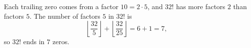 Each trailing zero comes from a factor $10=2\cdot5$, and $32!$ has more factors $2$ than factors $5$. The number of factors $5$ in $32!$ is
\[\left\lfloor\dfrac{32}{5}\right\rfloor+\left\lfloor\dfrac{32}{25}\right\rfloor=6+1=7,\]
so $32!$ ends in $\boxed{7}$ zeros.
